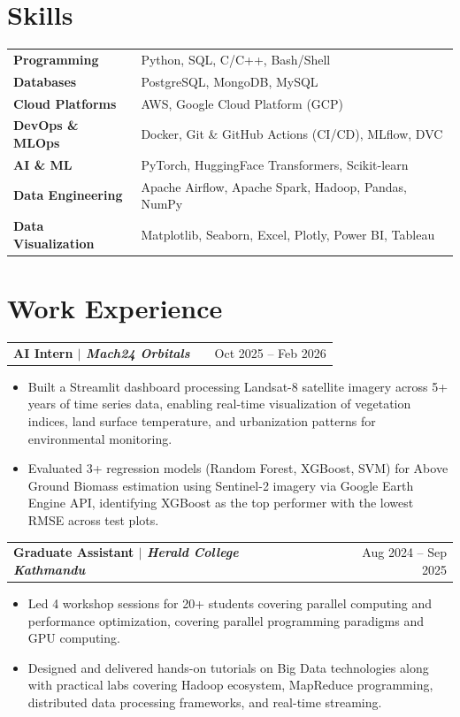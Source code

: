 \documentclass[a4paper,11pt]{article}
\makeatletter
\newenvironment{joblong}[2]
    {
    \begin{tabularx}{\linewidth}{@{}l X r@{}}
    \textbf{#1} & \hfill &  #2 \\[3.75pt]
    \end{tabularx}
    \begin{minipage}[t]{\linewidth}
    \begin{itemize}[nosep,after=\strut, leftmargin=1em, itemsep=3pt,label=--]
    }
    {
    \end{itemize}
    \end{minipage}    
    }
\makeatother
\begin{document}
\section{Skills}
\begin{tabularx}{\linewidth}{@{}l X@{}}
\textbf{Programming} &  \normalsize{Python, SQL, C/C++, Bash/Shell}\\
\textbf{Databases} &  \normalsize{PostgreSQL, MongoDB, MySQL}\\ 
\textbf{Cloud Platforms} &  \normalsize{AWS, Google Cloud Platform (GCP)}\\
\textbf{DevOps \& MLOps} &  \normalsize{Docker, Git \& GitHub Actions (CI/CD), MLflow, DVC}\\
\textbf{AI \& ML} &  \normalsize{PyTorch, HuggingFace Transformers, Scikit-learn}\\
\textbf{Data Engineering} &  \normalsize{Apache Airflow, Apache Spark, Hadoop, Pandas, NumPy}\\
\textbf{Data Visualization} & \normalsize{Matplotlib, Seaborn, Excel, Plotly, Power BI, Tableau}\\


\end{tabularx}


\section{Work Experience}

\begin{joblong}{AI Intern $|$ \normalfont\textit{Mach24 Orbitals}}{Oct 2025 -- Feb 2026}
\item Built a Streamlit dashboard processing Landsat-8 satellite imagery across 5+ years of time series data, enabling real-time visualization of vegetation indices, land surface temperature, and urbanization patterns for environmental monitoring.
\item Evaluated 3+ regression models (Random Forest, XGBoost, SVM) for Above Ground Biomass estimation using Sentinel-2 imagery via Google Earth Engine API, identifying XGBoost as the top performer with the lowest RMSE across test plots.
\end{joblong}

\begin{joblong}{Graduate Assistant $|$ \normalfont\textit{Herald College Kathmandu}}{Aug 2024 -- Sep 2025}
\item Led 4 workshop sessions for 20+ students covering parallel computing and performance optimization, covering parallel programming paradigms and GPU computing. 
\item Designed and delivered hands-on tutorials on Big Data technologies along with practical labs covering Hadoop ecosystem, MapReduce programming, distributed data processing frameworks, and real-time streaming.
\end{joblong}
\end{document}
